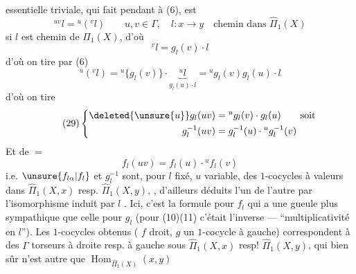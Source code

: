 essentielle triviale, qui fait pendant à (6), est
\[
\tag{28}{}^{uv}l={}^u({}^vl)
\qquad u,v\in\Gamma,\quad l:x\longrightarrow y\quad\text{chemin dans }\widehat\Pi_1(X)
\]
 si $l$ est chemin de $\Pi_1(X)$, d'où
\[
{}^vl=g_l(v)\cdot l
\]
 d'où on tire par (6)
\[
{}^u({}^vl)={}^u\{g_l(v)\}\cdot\underbrace{{}^ul}_{g_l(u)\cdot l}
={}^ug_l(v)g_l(u)\cdot l
\]
d'où on tire
\[
\tag{29}\left\{\begin{aligned}
\deleted{\unsure{u}}g_l(uv)&={}^ug_l(v)\cdot g_l(u)\qquad\text{soit}\\
g_l^{-1}(uv)&=g_l^{-1}(u)\cdot{}^ug_l^{-1}(v)
\end{aligned}\right.
\]
Et de $=$
\[
\tag{30}f_l(uv)=f_l(u)\cdot{}^uf_l(v)
\]
i.e. $\unsure{f_{l\alpha}|f_l}$ et $g_l^{-1}$ sont, pour $l$ fixé, $u$ variable, des $1$-cocycles  à valeurs dans $\widehat\Pi_1(X,x)$ resp. $\widehat\Pi_1(X,y)$, , d'ailleurs déduits l'un de l'autre par l'isomorphisme
induit par $l$ . Ici, c'est la formule pour $f_l$ qui a une gueule plus sympathique que celle pour $g_l$ (pour (10)(11) c'était l'inverse ---  ``multiplicativité en $l$''). Les $1$-cocycles obtenus ( $f$  droit, $g$ un $1$-cocycle à gauche) correspondent à des $\Gamma$ torseurs à droite resp. à gauche sous $\widehat\Pi_1(X,x)$ resp! $\widehat\Pi_1(X,y)$, qui bien sûr n'est autre que $\operatorname{Hom}_{\widehat\Pi_1(X)}(x,y)$

